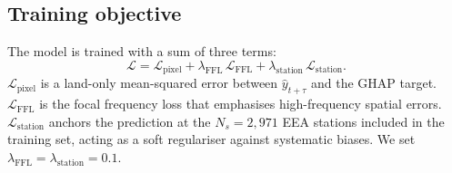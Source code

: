 \subsection{Training objective}
\label{sec:model:loss}

The model is trained with a sum of three terms:
\begin{equation}
\mathcal{L} = \mathcal{L}_{\text{pixel}}
            + \lambda_{\text{FFL}} \,\mathcal{L}_{\text{FFL}}
            + \lambda_{\text{station}} \,\mathcal{L}_{\text{station}}.
\end{equation}
$\mathcal{L}_{\text{pixel}}$ is a land-only mean-squared error
between $\hat{y}_{t+\tau}$ and the GHAP target.
$\mathcal{L}_{\text{FFL}}$ is the focal frequency loss
\citep{jiang2021focal} that emphasises high-frequency spatial
errors. $\mathcal{L}_{\text{station}}$ anchors the prediction at
the $N_s = 2{,}971$ EEA stations included in the training set,
acting as a soft regulariser against systematic biases.
We set $\lambda_{\text{FFL}} = \lambda_{\text{station}} = 0.1$.
